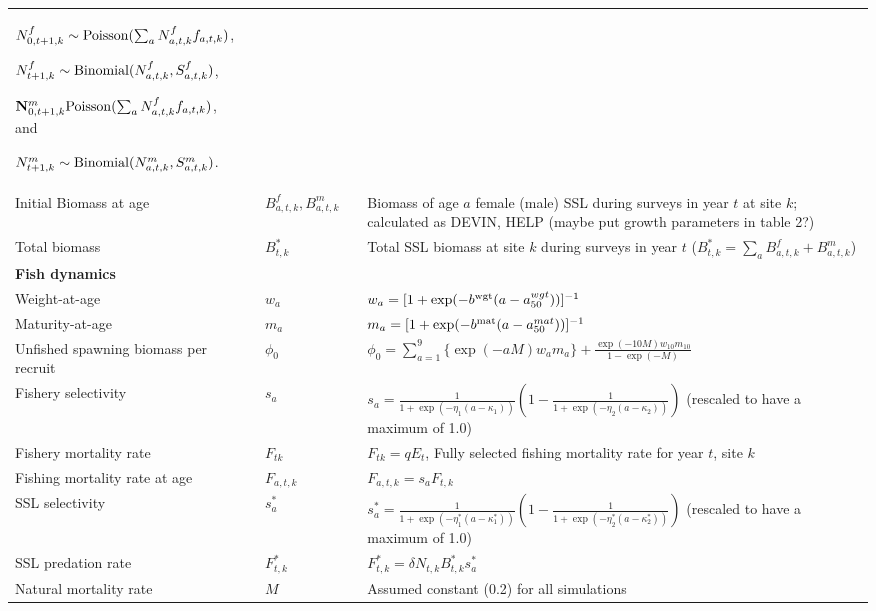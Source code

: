 \documentclass[nonumbib,leqno]{nrc1}
\begin{document}
\begin{longtable}{p{4cm}lll p{8cm}}
$N_{0,t+1,k}^f \sim {\rm Poisson}(\sum_a N_{a,t,k}^ff_{a,t,k})$,

$N_{t+1,k}^f \sim {\rm Binomial}(N_{a,t,k}^f,S_{a,t,k}^f)$,

${\bf N}_{0,t+1,k}^{m} {\rm Poisson}(\sum_a N_{a,t,k}^f f_{a,t,k})$, and

$N_{t+1,k}^{m} \sim {\rm Binomial}(N_{a,t,k}^{m},S_{a,t,k}^{m})$. \\
Initial
Biomass at age & & $B_{a,t,k}^f,B_{a,t,k}^{m}$ & & Biomass of age $a$ female (male) SSL during surveys in year $t$ at site $k$; calculated as DEVIN, HELP (maybe put growth parameters in table 2?)\\
Total biomass & & $B_{t,k}^*$ & & Total SSL biomass at site $k$ during surveys in year $t$ ($B_{t,k}^*=\sum_a B_{a,t,k}^f+B_{a,t,k}^{m}$) \\
\midrule
\multicolumn{1}{l}{\textbf{Fish dynamics}}\\
Weight-at-age & & $w_a$ & & $w_a = [ 1 + \exp(-b^{\rm wgt}(a-a_{50}^{wgt})) ]^{-1}$ \\
Maturity-at-age & & $m_a$ & & $m_a = [ 1 + \exp(-b^{\rm mat}(a-a_{50}^{mat})) ]^{-1}$ \\
Unfished spawning biomass per recruit & & $\phi_0$ & & $\phi_0=\sum_{a=1}^9 \{ \exp(-aM) w_a m_a \} + \frac{\exp(-10M) w_{10} m_{10}}{1-\exp(-M)}$ \\

Fishery selectivity  & & $s_a$ & &  $s_a = \frac{1}{1+\exp(-\eta_1(a-\kappa_1))} \left( 1- \frac{1}{1+\exp(-\eta_2(a-\kappa_2))} \right)$ (rescaled to have a maximum of 1.0)\\

Fishery mortality rate & & $F_{tk}$ & & $F_{tk}=q E_t$, Fully selected fishing mortality rate for year $t$, site $k$\\

Fishing mortality rate at age & & $F_{a,t,k}$ & & $F_{a,t,k}=s_a F_{t,k}$ \\

SSL selectivity  & & $s_a^*$ & &  $s_a^* = \frac{1}{1+\exp(-\eta_1^*(a-\kappa_1^*))} \left( 1- \frac{1}{1+\exp(-\eta_2^*(a-\kappa_2^*))} \right)$ (rescaled to have a maximum of 1.0)\\

SSL predation rate  & & $F_{t,k}^*$ & & $F_{t,k}^*=\delta N_{t,k} B_{t,k}^* s_a^*$ \\

Natural mortality rate & & $M$ & & Assumed constant (0.2) for all simulations \\


\end{longtable}
\end{document}
